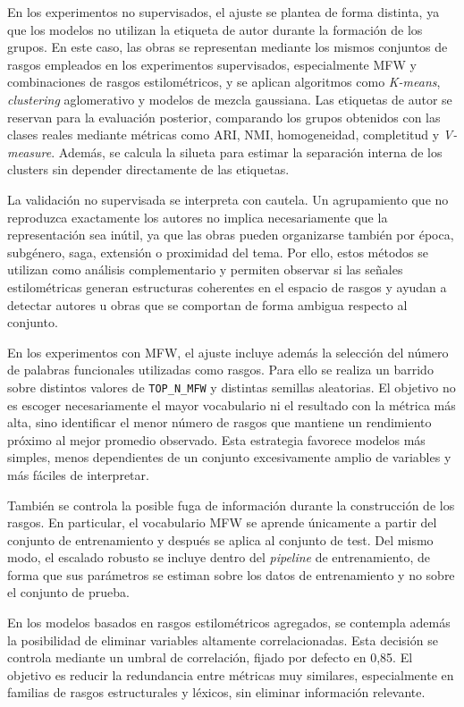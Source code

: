 \documentclass[IB]{TFUOC}%
\begin{document}
En los experimentos no supervisados, el ajuste se plantea de forma distinta, ya que los modelos no utilizan la etiqueta de autor durante la formación de los grupos. En este caso, las obras se representan mediante los mismos conjuntos de rasgos empleados en los experimentos supervisados, especialmente MFW y combinaciones de rasgos estilométricos, y se aplican algoritmos como \textit{K-means}, \textit{clustering} aglomerativo y modelos de mezcla gaussiana. Las etiquetas de autor se reservan para la evaluación posterior, comparando los grupos obtenidos con las clases reales mediante métricas como ARI, NMI, homogeneidad, completitud y \textit{V-measure}. Además, se calcula la silueta para estimar la separación interna de los clusters sin depender directamente de las etiquetas.

La validación no supervisada se interpreta con cautela. Un agrupamiento que no reproduzca exactamente los autores no implica necesariamente que la representación sea inútil, ya que las obras pueden organizarse también por época, subgénero, saga, extensión o proximidad del tema. Por ello, estos métodos se utilizan como análisis complementario y permiten observar si las señales estilométricas generan estructuras coherentes en el espacio de rasgos y ayudan a detectar autores u obras que se comportan de forma ambigua respecto al conjunto.

En los experimentos con MFW, el ajuste incluye además la selección del número de palabras funcionales utilizadas como rasgos. Para ello se realiza un barrido sobre distintos valores de \texttt{TOP\_N\_MFW} y distintas semillas aleatorias. El objetivo no es escoger necesariamente el mayor vocabulario ni el resultado con la métrica más alta, sino identificar el menor número de rasgos que mantiene un rendimiento próximo al mejor promedio observado. Esta estrategia favorece modelos más simples, menos dependientes de un conjunto excesivamente amplio de variables y más fáciles de interpretar.

También se controla la posible fuga de información durante la construcción de los rasgos. En particular, el vocabulario MFW se aprende únicamente a partir del conjunto de entrenamiento y después se aplica al conjunto de test. Del mismo modo, el escalado robusto se incluye dentro del \textit{pipeline} de entrenamiento, de forma que sus parámetros se estiman sobre los datos de entrenamiento y no sobre el conjunto de prueba.

En los modelos basados en rasgos estilométricos agregados, se contempla además la posibilidad de eliminar variables altamente correlacionadas. Esta decisión se controla mediante un umbral de correlación, fijado por defecto en 0,85. El objetivo es reducir la redundancia entre métricas muy similares, especialmente en familias de rasgos estructurales y léxicos, sin eliminar información relevante.
\end{document}
